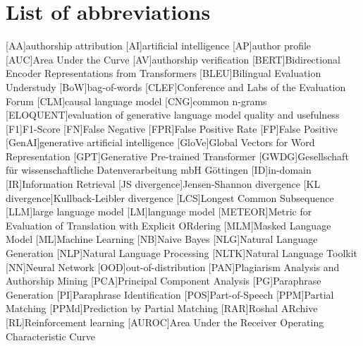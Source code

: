 \chapter*{List of abbreviations}

\begin{acronym}[XXXXXXXXX]
    [AA]{authorship attribution}
    [AI]{artificial intelligence}
    [AP]{author profile}
    [AUC]{Area Under the Curve}
    [AV]{authorship verification}
    [BERT]{Bidirectional Encoder Representations from Transformers}
    [BLEU]{Bilingual Evaluation Understudy}
    [BoW]{bag-of-words}
    [CLEF]{Conference and Labs of the Evaluation Forum}
    [CLM]{causal language model}
    [CNG]{common n-grams}
    [ELOQUENT]{evaluation of generative language model quality and usefulness}
    [F1]{F1-Score}
    [FN]{False Negative}
    [FPR]{False Positive Rate}
    [FP]{False Positive}
    [GenAI]{generative artificial intelligence}
    [GloVe]{Global Vectors for Word Representation}
    [GPT]{Generative Pre-trained Transformer}
    [GWDG]{Gesellschaft für wissenschaftliche Datenverarbeitung mbH Göttingen}
    [ID]{in-domain}
    [IR]{Information Retrieval}
    [JS divergence]{Jensen-Shannon divergence}
    [KL divergence]{Kullback-Leibler divergence}
    [LCS]{Longest Common Subsequence}
    [LLM]{large language model}
    [LM]{language model}
    [METEOR]{Metric for Evaluation of Translation with Explicit ORdering}
    [MLM]{Masked Language Model}
    [ML]{Machine Learning}
    [NB]{Naive Bayes}
    [NLG]{Natural Language Generation}
    [NLP]{Natural Language Processing}
    [NLTK]{Natural Language Toolkit}
    [NN]{Neural Network}
    [OOD]{out-of-distribution}
    [PAN]{Plagiarism Analysis and Authorship Mining} %
    [PCA]{Principal Component Analysis}
    [PG]{Paraphrase Generation}
    [PI]{Paraphrase Identification}
    [POS]{Part-of-Speech}
    [PPM]{Partial Matching}
    [PPMd]{Prediction by Partial Matching}
    [RAR]{Roshal ARchive}
    [RL]{Reinforcement learning}
    [AUROC]{Area Under the Receiver Operating Characteristic Curve}

\end{acronym}

